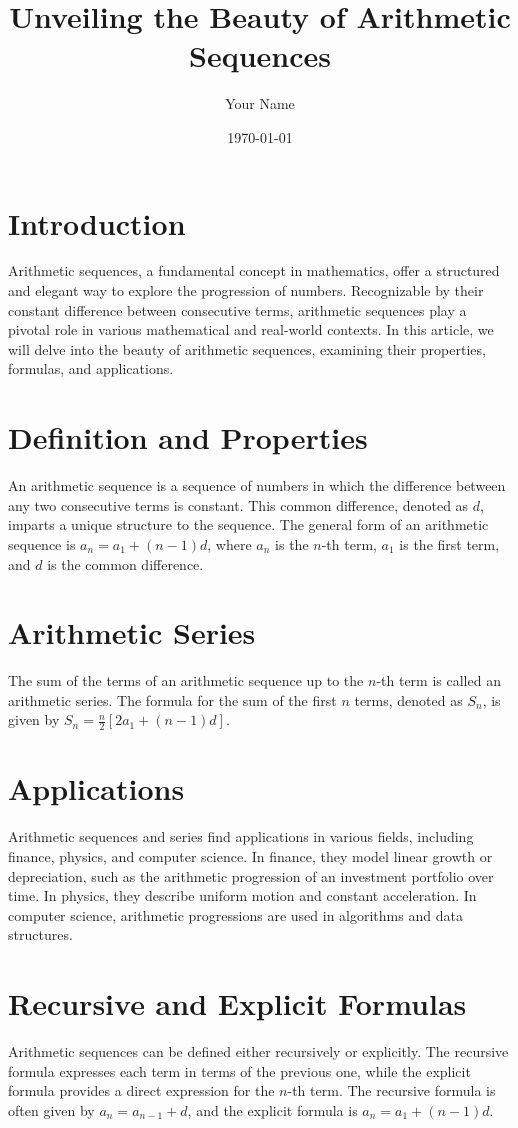 \documentclass{article}
\title{Unveiling the Beauty of Arithmetic Sequences}
\author{Your Name}
\date{\today}
\begin{document}
\maketitle

\section*{Introduction}
Arithmetic sequences, a fundamental concept in mathematics, offer a structured and elegant way to explore the progression of numbers. Recognizable by their constant difference between consecutive terms, arithmetic sequences play a pivotal role in various mathematical and real-world contexts. In this article, we will delve into the beauty of arithmetic sequences, examining their properties, formulas, and applications.

\section*{Definition and Properties}
An arithmetic sequence is a sequence of numbers in which the difference between any two consecutive terms is constant. This common difference, denoted as $d$, imparts a unique structure to the sequence. The general form of an arithmetic sequence is $a_n = a_1 + (n-1)d$, where $a_n$ is the $n$-th term, $a_1$ is the first term, and $d$ is the common difference.

\section*{Arithmetic Series}
The sum of the terms of an arithmetic sequence up to the $n$-th term is called an arithmetic series. The formula for the sum of the first $n$ terms, denoted as $S_n$, is given by $S_n = \frac{n}{2}[2a_1 + (n-1)d]$.

\section*{Applications}
Arithmetic sequences and series find applications in various fields, including finance, physics, and computer science. In finance, they model linear growth or depreciation, such as the arithmetic progression of an investment portfolio over time. In physics, they describe uniform motion and constant acceleration. In computer science, arithmetic progressions are used in algorithms and data structures.

\section*{Recursive and Explicit Formulas}
Arithmetic sequences can be defined either recursively or explicitly. The recursive formula expresses each term in terms of the previous one, while the explicit formula provides a direct expression for the $n$-th term. The recursive formula is often given by $a_{n} = a_{n-1} + d$, and the explicit formula is $a_n = a_1 + (n-1)d$.
\end{document}
